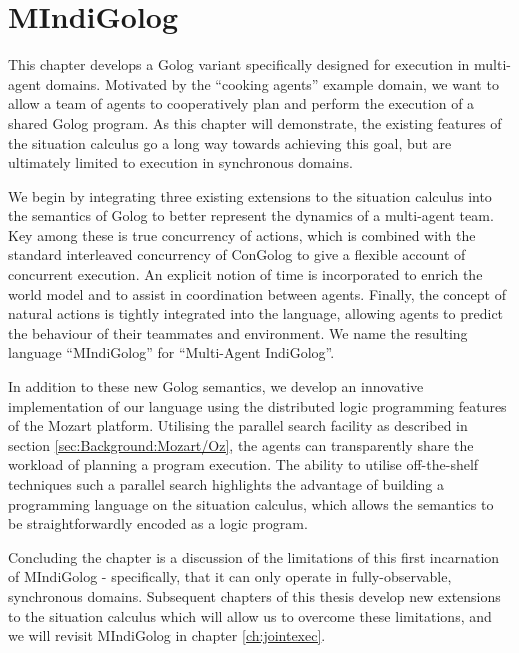 

\chapter{MIndiGolog}

\label{ch:mindigolog}

This chapter develops a Golog variant specifically designed for execution
in multi-agent domains. Motivated by the {}``cooking agents'' example
domain, we want to allow a team of agents to cooperatively plan and
perform the execution of a shared Golog program. As this chapter will
demonstrate, the existing features of the situation calculus go a
long way towards achieving this goal, but are ultimately limited to
execution in synchronous domains.

We begin by integrating three existing extensions to the situation
calculus into the semantics of Golog to better represent the dynamics
of a multi-agent team. Key among these is true concurrency of actions,
which is combined with the standard interleaved concurrency of ConGolog
to give a flexible account of concurrent execution. An explicit notion
of time is incorporated to enrich the world model and to assist in
coordination between agents. Finally, the concept of natural actions
is tightly integrated into the language, allowing agents to predict
the behaviour of their teammates and environment. We name the resulting
language {}``MIndiGolog'' for {}``Multi-Agent IndiGolog''.

In addition to these new Golog semantics, we develop an innovative
implementation of our language using the distributed logic programming
features of the Mozart platform. Utilising the parallel search facility
as described in section \ref{sec:Background:Mozart/Oz}, the agents
can transparently share the workload of planning a program execution.
The ability to utilise off-the-shelf techniques such a parallel search
highlights the advantage of building a programming language on the
situation calculus, which allows the semantics to be straightforwardly
encoded as a logic program.

Concluding the chapter is a discussion of the limitations of this
first incarnation of MIndiGolog - specifically, that it can only operate
in fully-observable, synchronous domains. Subsequent chapters of this
thesis develop new extensions to the situation calculus which will
allow us to overcome these limitations, and we will revisit MIndiGolog
in chapter \ref{ch:jointexec}.

